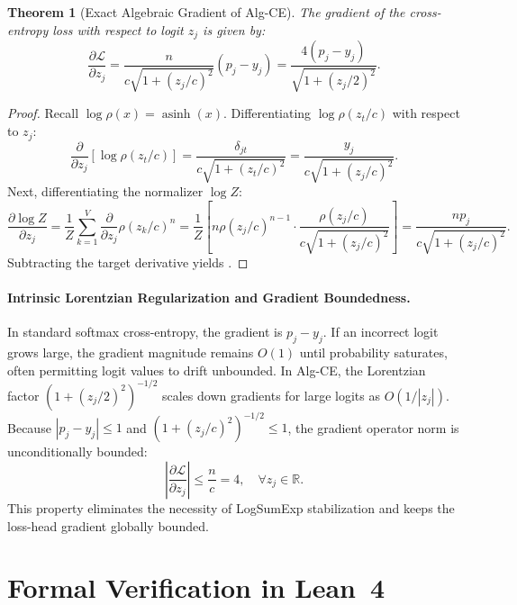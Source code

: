 \documentclass[11pt,a4paper]{article}
\newtheorem{theorem}{Theorem}[section]
\theoremstyle{definition}
\newcommand{\asinh}{\operatorname{asinh}}
\begin{document}
\begin{theorem}[Exact Algebraic Gradient of Alg-CE]
The gradient of the cross-entropy loss with respect to logit $z_j$ is given by:
\begin{equation}
\label{eq:alg_ce_grad}
\frac{\partial \mathcal{L}}{\partial z_j} = \frac{n}{c \sqrt{1 + (z_j/c)^2}} (p_j - y_j) = \frac{4 (p_j - y_j)}{\sqrt{1 + (z_j/2)^2}}.
\end{equation}
\end{theorem}
\begin{proof}
Recall $\log \rho(x) = \asinh(x)$. Differentiating $\log \rho(z_t/c)$ with respect to $z_j$:
\begin{equation}
\frac{\partial}{\partial z_j}\left[\log \rho(z_t/c)\right] = \frac{\delta_{jt}}{c \sqrt{1 + (z_t/c)^2}} = \frac{y_j}{c \sqrt{1 + (z_j/c)^2}}.
\end{equation}
Next, differentiating the normalizer $\log Z$:
\begin{equation}
\frac{\partial \log Z}{\partial z_j} = \frac{1}{Z}\sum_{k=1}^V \frac{\partial}{\partial z_j}\rho(z_k/c)^n = \frac{1}{Z}\left[n \rho(z_j/c)^{n-1} \cdot \frac{\rho(z_j/c)}{c \sqrt{1 + (z_j/c)^2}}\right] = \frac{n p_j}{c \sqrt{1 + (z_j/c)^2}}.
\end{equation}
Subtracting the target derivative yields .
\end{proof}

\paragraph{Intrinsic Lorentzian Regularization and Gradient Boundedness.}
In standard softmax cross-entropy, the gradient is $p_j - y_j$. If an incorrect logit grows large, the gradient magnitude remains $O(1)$ until probability saturates, often permitting logit values to drift unbounded. In Alg-CE, the Lorentzian factor $\left(1 + (z_j/2)^2\right)^{-1/2}$ scales down gradients for large logits as $O(1/|z_j|)$. Because $|p_j - y_j| \le 1$ and $(1 + (z_j/c)^2)^{-1/2} \le 1$, the gradient operator norm is unconditionally bounded:
\begin{equation}
\left| \frac{\partial \mathcal{L}}{\partial z_j} \right| \le \frac{n}{c} = 4, \quad \forall z_j \in \mathbb{R}.
\end{equation}
This property eliminates the necessity of LogSumExp stabilization and keeps the loss-head gradient globally bounded.

\section{Formal Verification in Lean~4}
\label{sec:formal}
\end{document}
